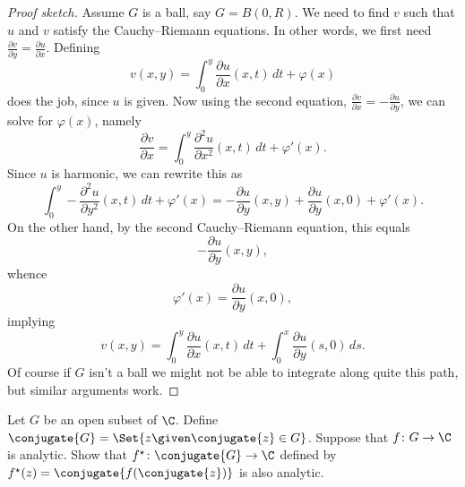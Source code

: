 \begin{proof}[Proof sketch]
	Assume $G$ is a ball, say $G = B(0, R)$.
	We need to find $v$ such that $u$ and $v$ satisfy the Cauchy--Riemann equations.
	In other words, we first need $\frac{\partial v}{\partial y} = \frac{\partial u}{\partial x}$.
	Defining
	\[
		v(x, y) = \int_0^y \frac{\partial u}{\partial x}(x, t) \, d t + \varphi(x)
	\]
	does the job, since $u$ is given.
	Now using the second equation, $\frac{\partial v}{\partial x} = - \frac{\partial u}{\partial y}$, we can solve for $\varphi(x)$, namely
	\[
		\frac{\partial v}{\partial x} = \int_0^y \frac{\partial^2 u}{\partial x^2}(x, t) \, d t + \varphi'(x).
	\]
	Since $u$ is harmonic, we can rewrite this as
	\[
		\int_0^y - \frac{\partial^2 u}{\partial y^2} (x, t) \, d t + \varphi'(x) = - \frac{\partial u}{\partial y} (x, y) + \frac{\partial u}{\partial y}(x, 0) + \varphi'(x).
	\]
	On the other hand, by the second Cauchy--Riemann equation, this equals
	\[
		- \frac{\partial u}{\partial y}(x, y),
	\]
	whence
	\[
		\varphi'(x) = \frac{\partial u}{\partial y}(x, 0),
	\]
	implying
	\[
		v(x, y) = \int_0^y \frac{\partial u}{\partial x}(x, t) \, d t + \int_0^x \frac{\partial u}{\partial y}(s, 0) \, d s.
	\]
	Of course if $G$ isn't a ball we might not be able to integrate along quite this path, but similar arguments work.
\end{proof}

\begin{exercise}\label{hw1.3}
	Let $G$ be an open subset of $\C$.
	Define $\conjugate{G} = \Set{z \given \conjugate{z} \in G}$.
	Suppose that $f \colon G \to \C$ is analytic.
	Show that $f^\star \colon \conjugate{G} \to \C$ defined by $f^\star(z) = \conjugate{f(\conjugate{z})}$ is also analytic.
\end{exercise}
